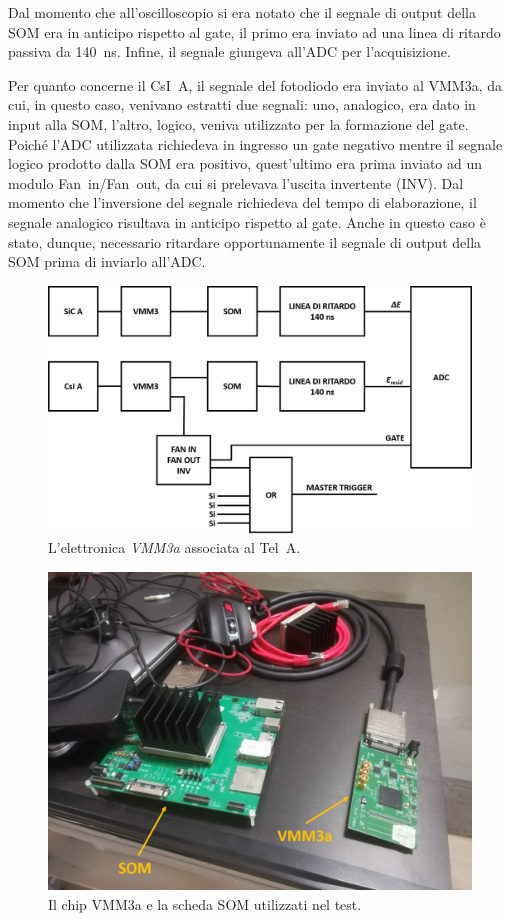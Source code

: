 Dal momento che all'oscilloscopio si era notato che il segnale di output della SOM era in anticipo rispetto al gate, il primo era inviato ad una linea di ritardo passiva da 140~ns. Infine, il segnale giungeva all'ADC per l'acquisizione.


Per quanto concerne il CsI~A, il segnale del fotodiodo era inviato al VMM3a, da cui, in questo caso, venivano estratti due segnali: uno, analogico, era dato in input alla SOM, l'altro, logico, veniva utilizzato per la formazione del gate. 
Poiché l'ADC utilizzata richiedeva in ingresso un gate negativo mentre il segnale logico prodotto dalla SOM era positivo, quest'ultimo era prima inviato ad un modulo Fan~in/Fan~out, da cui si prelevava l'uscita invertente (INV).
Dal momento che l'inversione del segnale richiedeva del tempo di elaborazione, il segnale analogico risultava in anticipo rispetto al gate. Anche in questo caso è stato, dunque, necessario ritardare opportunamente il segnale di output della SOM prima di inviarlo all'ADC.


\begin{figure} [!p]
	\centering
	\includegraphics[width=\textwidth, keepaspectratio]{Grafici/elettronica_vmm.png}
	\caption{L'elettronica \emph{VMM3a} associata al Tel~A.} \label{fig:elettronica_vmm}
\end{figure}

\begin{figure} [!p]
	\centering
	\includegraphics[width=\textwidth, keepaspectratio]{Grafici/vmm3a_som.png}
	\caption{Il chip VMM3a e la scheda SOM utilizzati nel test.} \label{fig:vmm+som}
\end{figure}